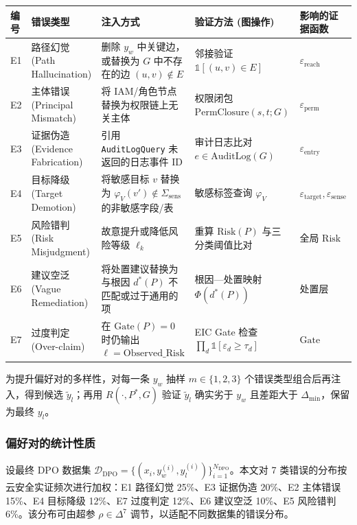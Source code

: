 \documentclass[a4paper,12pt]{ctexart}
\begin{document}
\begin{table}[htbp]
\centering
\small
\setlength{\tabcolsep}{4pt}
\begin{tabular}{|l|l|l|l|l|}
\hline
\textbf{编号} & \textbf{错误类型} & \textbf{注入方式} & \textbf{验证方法 (图操作)} & \textbf{影响的证据函数} \\
\hline
E1 & 路径幻觉 (Path Hallucination) & 删除 $y_w$ 中关键边，或替换为 $G$ 中不存在的边 $(u,v)\notin E$ & 邻接验证 $\mathbb{1}[(u,v)\in E]$ & $\varepsilon_{\mathrm{reach}}$ \\
\hline
E2 & 主体错误 (Principal Mismatch) & 将 IAM/角色节点替换为权限链上无关主体 & 权限闭包 $\mathrm{PermClosure}(s,t;G)$ & $\varepsilon_{\mathrm{perm}}$ \\
\hline
E3 & 证据伪造 (Evidence Fabrication) & 引用 \texttt{AuditLogQuery} 未返回的日志事件 ID & 审计日志比对 $e\in \mathrm{AuditLog}(G)$ & $\varepsilon_{\mathrm{entry}}$ \\
\hline
E4 & 目标降级 (Target Demotion) & 将敏感目标 $v$ 替换为 $\varphi_V(v')\notin\Sigma_{\mathrm{sens}}$ 的非敏感字段/表 & 敏感标签查询 $\varphi_V$ & $\varepsilon_{\mathrm{target}},\varepsilon_{\mathrm{sense}}$ \\
\hline
E5 & 风险错判 (Risk Misjudgment) & 故意提升或降低风险等级 $\ell_k$ & 重算 $\mathrm{Risk}(P)$ 与三分类阈值比对 & 全局 $\mathrm{Risk}$ \\
\hline
E6 & 建议空泛 (Vague Remediation) & 将处置建议替换为与根因 $d^*(P)$ 不匹配或过于通用的项 & 根因—处置映射 $\Phi(d^*(P))$ & 处置层 \\
\hline
E7 & 过度判定 (Over-claim) & 在 $\mathrm{Gate}(P)=0$ 时仍输出 $\ell=\text{Observed\_Risk}$ & EIC Gate 检查 $\prod_d\mathbb{1}[\varepsilon_d\geq \tau_d]$ & $\mathrm{Gate}$ \\
\hline
\end{tabular}
\end{table}

为提升偏好对的多样性，对每一条 $y_w$ 抽样 $m\in\{1,2,3\}$ 个错误类型组合后再注入，得到候选 $\tilde y_l$；再用 $R(\cdot,P^*,G)$ 验证 $\tilde y_l$ 确实劣于 $y_w$ 且差距大于 $\Delta_{\min}$，保留为最终 $y_l$。

\subsubsection{偏好对的统计性质}

设最终 DPO 数据集 $\mathcal{D}_{\mathrm{DPO}}=\{(x_i,y_w^{(i)},y_l^{(i)})\}_{i=1}^{N_{\mathrm{DPO}}}$。本文对 7 类错误的分布按云安全实证频次进行加权：E1 路径幻觉 25\%、E3 证据伪造 20\%、E2 主体错误 15\%、E4 目标降级 12\%、E7 过度判定 12\%、E6 建议空泛 10\%、E5 风险错判 6\%。该分布可由超参 $\rho\in\Delta^7$ 调节，以适配不同数据集的错误分布。
\end{document}
